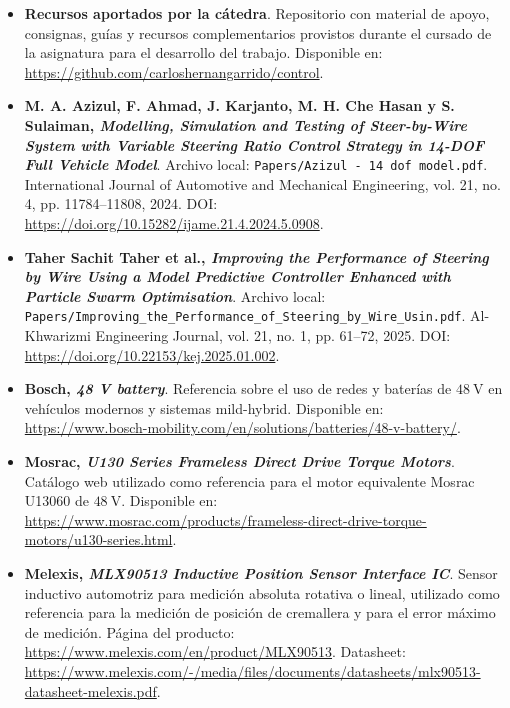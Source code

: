 \documentclass{article}
\begin{document}
\begin{itemize}
    \item \hypertarget{ref:recursos-catedra}{}\textbf{Recursos aportados por la cátedra}. Repositorio con material de apoyo, consignas, guías y recursos complementarios provistos durante el cursado de la asignatura para el desarrollo del trabajo. Disponible en: \url{https://github.com/carloshernangarrido/control}.
    
    \item \hypertarget{ref:azizul-2024}{}\textbf{M. A. Azizul, F. Ahmad, J. Karjanto, M. H. Che Hasan y S. Sulaiman, \textit{Modelling, Simulation and Testing of Steer-by-Wire System with Variable Steering Ratio Control Strategy in 14-DOF Full Vehicle Model}}. Archivo local: \texttt{Papers/Azizul - 14 dof model.pdf}. International Journal of Automotive and Mechanical Engineering, vol. 21, no. 4, pp. 11784--11808, 2024. DOI: \url{https://doi.org/10.15282/ijame.21.4.2024.5.0908}.
    
    \item \hypertarget{ref:taher-2025}{}\textbf{Taher Sachit Taher et al., \textit{Improving the Performance of Steering by Wire Using a Model Predictive Controller Enhanced with Particle Swarm Optimisation}}. Archivo local: \texttt{Papers/Improving\_the\_Performance\_of\_Steering\_by\_Wire\_Usin.pdf}. Al-Khwarizmi Engineering Journal, vol. 21, no. 1, pp. 61--72, 2025. DOI: \url{https://doi.org/10.22153/kej.2025.01.002}.
    
    \item \hypertarget{ref:bosch-48v}{}\textbf{Bosch, \textit{48 V battery}}. Referencia sobre el uso de redes y baterías de $48\ \mathrm{V}$ en vehículos modernos y sistemas mild-hybrid. Disponible en: \url{https://www.bosch-mobility.com/en/solutions/batteries/48-v-battery/}.

    \item \hypertarget{ref:mosrac-u13060}{}\textbf{Mosrac, \textit{U130 Series Frameless Direct Drive Torque Motors}}. Catálogo web utilizado como referencia para el motor equivalente Mosrac U13060 de $48\ \mathrm{V}$. Disponible en: \url{https://www.mosrac.com/products/frameless-direct-drive-torque-motors/u130-series.html}.  

    \item \hypertarget{ref:mlx90513}{}\textbf{Melexis, \textit{MLX90513 Inductive Position Sensor Interface IC}}. Sensor inductivo automotriz para medición absoluta rotativa o lineal, utilizado como referencia para la medición de posición de cremallera y para el error máximo de medición. Página del producto: \url{https://www.melexis.com/en/product/MLX90513}. Datasheet: \url{https://www.melexis.com/-/media/files/documents/datasheets/mlx90513-datasheet-melexis.pdf}.


\end{itemize}
\end{document}
